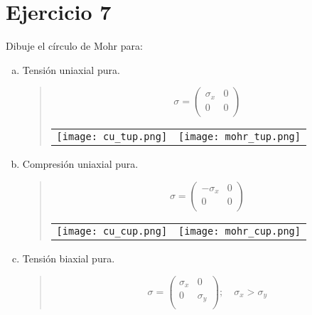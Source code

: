 \documentclass[a4paper,12pt,twoside,final,spanish]{article}
\begin{document}
\section*{Ejercicio 7}

Dibuje el círculo de Mohr para:

\begin{enumerate}[a.]
\item Tensión uniaxial pura.

\begin{quote}
\[
\sigma=
\left(\begin{matrix}
\sigma_{x} & 0 \\
0 & 0 \\
\end{matrix}\right)
\]

\begin{center}
\begin{tabular}{c c}
\texttt{[image: cu\_tup.png]} &
\texttt{[image: mohr\_tup.png]}
\end{tabular}
\end{center}
\end{quote}

\item Compresión uniaxial pura.

\begin{quote}
\[
\sigma=
\left(\begin{matrix}
-\sigma_{x} & 0 \\
0 & 0 \\
\end{matrix}\right)
\]

\begin{center}
\begin{tabular}{c c}
\texttt{[image: cu\_cup.png]} &
\texttt{[image: mohr\_cup.png]}
\end{tabular}
\end{center}
\end{quote}

\item Tensión biaxial pura.

\begin{quote}
\[
\sigma=
\left(\begin{matrix}
\sigma_{x} & 0 \\
0 & \sigma_{y} \\
\end{matrix}\right);\quad \sigma_{x}>\sigma_{y}
\]


\end{quote}
\end{enumerate}
\end{document}
